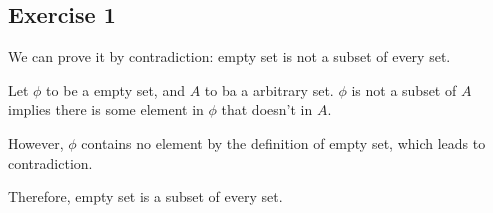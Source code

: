 \subsection*{Exercise 1}
We can prove it by contradiction: empty set is not a subset of every set.

Let $\phi$ to be a empty set, and $A$ to ba a arbitrary set. 
$\phi$ is not a subset of $A$ implies there is some element in $\phi$ that doesn't in $A$.

However, $\phi$ contains no element by the definition of empty set, which leads to contradiction.

Therefore, empty set is a subset of every set.
